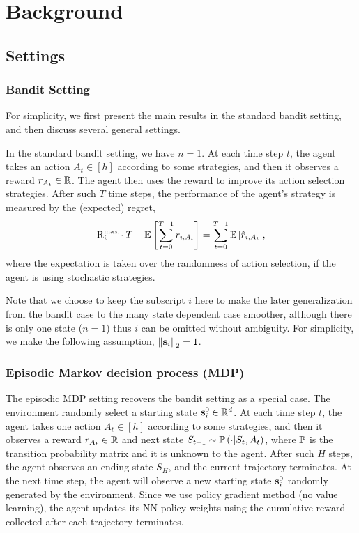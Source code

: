 \section{Background}

\subsection{Settings}

\subsubsection{Bandit Setting}

For simplicity, we first present the main results in the standard bandit setting, and then discuss several general settings.

In the standard bandit setting, we have $n = 1$. At each time step $t$, the agent takes an action $A_t \in [h]$ according to some strategies, and then it observes a reward $r_{A_t} \in {\mathbb{R}}$. The agent then uses the reward to improve its action selection strategies. After such $T$ time steps, the performance of the agent's strategy is measured by the (expected) regret,
\begin{equation}
\label{eq:expected_regret}
    {\text{R}}_i^{\max} \cdot T - {\mathbb{E}} \left[ \sum\limits_{t=0}^{T-1}{  r_{i, A_t}  } \right] = \sum\limits_{t=0}^{T-1}{ {\mathbb{E}} \left[ \tilde{r}_{i, A_t} \right] },
\end{equation}
where the expectation is taken over the randomness of action selection, if the agent is using stochastic strategies.

Note that we choose to keep the subscript $i$ here to make the later generalization from the bandit case to the many state dependent case smoother, although there is only one state ($n = 1$) thus $i$ can be omitted without ambiguity. For simplicity, we make the following assumption, $\left\| {\mathbf{s}}_{i} \right\|_2 = 1$.

\subsubsection{Episodic Markov decision process (MDP)}

The episodic MDP setting recovers the bandit setting as a special case. The environment randomly select a starting state ${\mathbf{s}}_i^0 \in {\mathbb{R}}^d$. At each time step $t$, the agent takes one action $A_t \in [h]$ according to some strategies, and then it observes a reward $r_{A_t} \in {\mathbb{R}}$ and next state $S_{t+1} \sim {\mathbb{P}}\left( \cdot \middle| S_t, A_t \right)$, where ${\mathbb{P}}$ is the transition probability matrix and it is unknown to the agent. After such $H$ steps, the agent observes an ending state $S_H$, and the current trajectory terminates. At the next time step, the agent will observe a new starting state ${\mathbf{s}}_i^0$ randomly generated by the environment. Since we use policy gradient method (no value learning), the agent updates its NN policy weights using the cumulative reward collected after each trajectory terminates.

